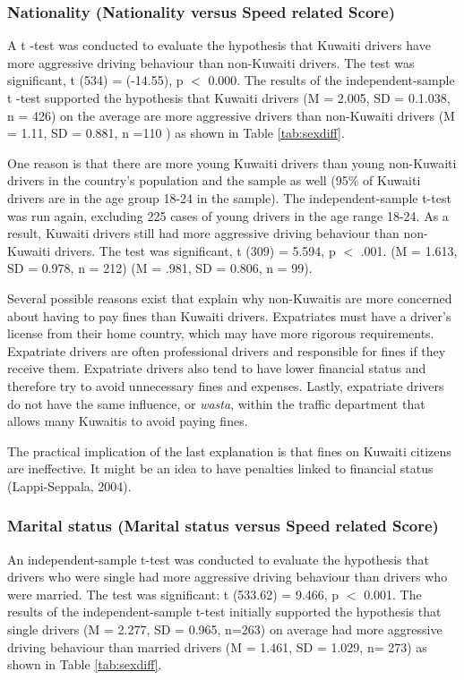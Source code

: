 \documentclass[preprint,12pt,a4paper,authoryear]{elsarticle}
\begin{document}
\subsubsection{Nationality (Nationality versus Speed related Score)}

A t -test was conducted to evaluate the hypothesis that Kuwaiti drivers have more aggressive driving behaviour than non-Kuwaiti drivers. The test was significant, t (534) = (-14.55), p $<$ 0.000. The results of the independent-sample t -test supported the hypothesis that Kuwaiti drivers (M = 2.005, SD = 0.1.038, n = 426) on the average are more aggressive drivers than non-Kuwaiti drivers (M = 1.11, SD = 0.881, n =110 ) as shown in Table \ref{tab:sexdiff}. 


One reason is that there are more young Kuwaiti drivers than young non-Kuwaiti drivers in the country's population and the sample as well (95\% of Kuwaiti drivers are in the age group 18-24 in the sample). The independent-sample t-test was run again, excluding 225 cases of young drivers in the age range 18-24. As a result, Kuwaiti drivers still had more aggressive driving behaviour than non-Kuwaiti drivers. The test was significant, t (309) = 5.594, p $<$ .001. (M = 1.613, SD = 0.978, n = 212) (M = .981, SD = 0.806,  n = 99). 

Several possible reasons exist that explain why non-Kuwaitis are more concerned about having to pay fines than Kuwaiti drivers. Expatriates must have a driver's license from their home country, which may have more rigorous requirements. Expatriate drivers are often professional drivers and responsible for fines if they receive them. Expatriate drivers also tend to have lower financial status and therefore try to avoid unnecessary fines and expenses. Lastly, expatriate drivers do not have the same influence, or \textit{ wasta}, within the traffic department that allows many Kuwaitis to avoid paying fines.

The practical implication of the last explanation is that fines on Kuwaiti citizens are ineffective. It might be an idea to have penalties linked to financial status (Lappi-Seppala, 2004). 

\subsubsection{Marital status (Marital status versus Speed related Score)}

An independent-sample t-test was conducted to evaluate the hypothesis that drivers who were single had more aggressive driving behaviour than drivers who were married. The test was significant: t (533.62) = 9.466, p $<$ 0.001. The results of the independent-sample t-test initially supported the hypothesis that single drivers (M = 2.277, SD = 0.965, n=263) on average had more aggressive driving behaviour than married drivers (M = 1.461, SD = 1.029, n= 273) as shown in Table \ref{tab:sexdiff}.
\end{document}
